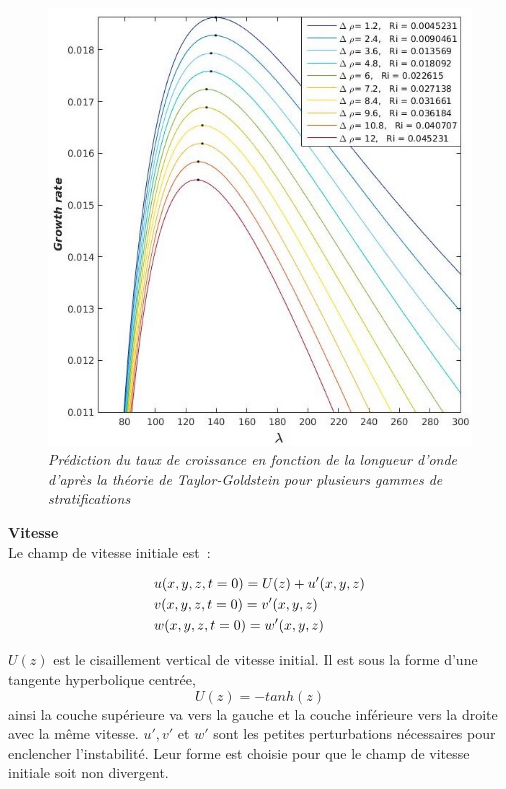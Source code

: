 \documentclass[a4paper,12pt]{article}
\begin{document}
    \begin{figure}[!h]
	\centering		
		\includegraphics[width=0.75\linewidth]{figures/TG_delatrho.jpg}
\caption[Taylor-Goldstein]{\textit{Prédiction du taux de croissance en fonction de la longueur d'onde d'après la théorie de Taylor-Goldstein pour plusieurs gammes de stratifications}}
	\label{TG_deltarho}
\end{figure}
    \newline
    \textbf{Vitesse} \\
    Le champ de vitesse initiale est : 
    \begin{subequation}
    \begin{align}
        \displaystyle
            \label{u_ini}
            & u(x,y,z,t=0)=U(z)+u'(x,y,z) \\
            \label{v_ini}
            & v(x,y,z,t=0)=v'(x,y,z) \\
            \label{w_ini}
            & w(x,y,z,t=0)=w'(x,y,z)
    \end{align}
    \end{subequation}
    $U(z)$ est le cisaillement vertical de vitesse initial. Il est sous la forme d'une tangente hyperbolique centrée,
    \begin{equation}
        \label{u0_ini}
        U(z)=-tanh(z)
    \end{equation}
    ainsi la couche supérieure va vers la gauche et la couche inférieure vers la droite avec la même vitesse. $u', v'$ et $w'$ sont les petites perturbations nécessaires pour enclencher l'instabilité. Leur forme est choisie pour que le champ de vitesse initiale soit non divergent.
\end{document}
